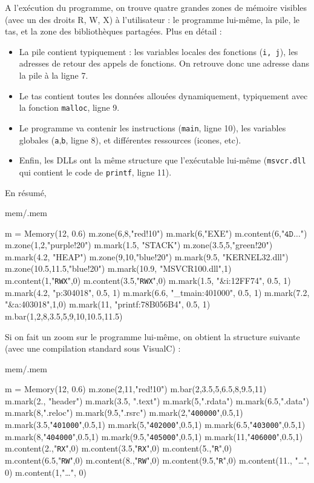 \documentclass{book}
\newcounter{Qcours}
\newenvironment{memory}{%
	\noindent
	\VerbatimEnvironment\stepcounter{Qcours}%
	\begin{VerbatimOut}{mem/\theQcours.mem}%
	}{\end{VerbatimOut}%
}
\newcommand{\code}[1]{\texttt{#1}}
\begin{document}
A l'exécution du programme, on trouve  quatre grandes zones de mémoire visibles (avec un des droits R, W, X) à l'utilisateur :  le programme lui-même, la pile, le tas, et la zone des bibliothèques partagées. Plus en détail : 
\begin{itemize}
	\item La pile contient typiquement : les variables locales des fonctions (\code{i, j}), les adresses de retour des appels de fonctions. On retrouve donc une adresse dans la pile à la ligne 7. 
	\item Le tas contient toutes les données allouées dynamiquement, typiquement avec la fonction \code{malloc}, ligne 9.  
	\item   Le programme va contenir les instructions (\code{main}, ligne 10), les variables globales (\code{a},\code{b}, ligne 8), et différentes ressources (icones, etc). 
	\item  Enfin, les DLLs ont la même structure que l'exécutable lui-même (\code{msvcr.dll} qui contient le code de \code{printf}, ligne 11). %
\end{itemize}

En résumé, 

\medskip
\begin{memory}
m = Memory(12, 0.6)
m.zone(6,8,"red!10")
m.mark(6,"EXE")
m.content(6,"$\code{4D}\ldots$")
m.zone(1,2,"purple!20")
m.mark(1.5, "STACK")
m.zone(3.5,5,"green!20")
m.mark(4.2, "HEAP")
m.zone(9,10,"blue!20")
m.mark(9.5, "KERNEL32.dll")
m.zone(10.5,11.5,"blue!20")
m.mark(10.9, "MSVCR100.dll",1)
m.content(1,"\code{RWX}",0)
m.content(3.5,"\code{RWX}",0)
m.mark(1.5, "\&i:12FF74", 0.5, 1)
m.mark(4.2, "p:304018", 0.5, 1)
m.mark(6.6, "\_tmain:401000", 0.5, 1)
m.mark(7.2, "\&a:403018",1,0)
m.mark(11, "printf:78B056B4", 0.5, 1)
m.bar(1,2,8,3.5,5,9,10,10.5,11.5)
\end{memory}

Si on fait un zoom sur le programme lui-même, on obtient la structure suivante (avec une compilation standard sous VisualC) : 

\bigskip
\begin{memory}
m = Memory(12, 0.6)
m.zone(2,11,"red!10")
m.bar(2,3.5,5,6.5,8,9.5,11)
m.mark(2., "header")
m.mark(3.5, ".text")
m.mark(5,".rdata")
m.mark(6.5,".data")
m.mark(8,".reloc")
m.mark(9.5,".rsrc")
m.mark(2,"\code{400000}",0.5,1)
m.mark(3.5,"\code{401000}",0.5,1)
m.mark(5,"\code{402000}",0.5,1)
m.mark(6.5,"\code{403000}",0.5,1)
m.mark(8,"\code{404000}",0.5,1)
m.mark(9.5,"\code{405000}",0.5,1)
m.mark(11,"\code{406000}",0.5,1)
m.content(2.,"\code{RX}",0)
m.content(3.5,"\code{RX}",0)
m.content(5.,"\code{R}",0)
m.content(6.5,"\code{RW}",0)
m.content(8.,"\code{RW}",0)
m.content(9.5,"\code{R}",0)
m.content(11., "\ldots", 0)
m.content(1,"\ldots", 0)
\end{memory}
\end{document}
